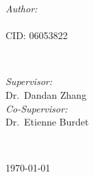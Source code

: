 \begin{titlepage}
\begin{minipage}{0.4\textwidth}
\begin{flushleft} \large
\emph{Author:}\\
\@author \\ CID: 06053822
\end{flushleft}
\end{minipage}
~
\begin{minipage}{0.4\textwidth}
\begin{flushright} \large
\emph{Supervisor:} \\
Dr.\ Dandan Zhang \\[1.2em]
\emph{Co-Supervisor:} \\
Dr.\ Etienne Burdet %
\end{flushright}
\end{minipage}\\[2cm]
\makeatother



{\large \today}\\[2cm] %

\vfill %

\end{titlepage}